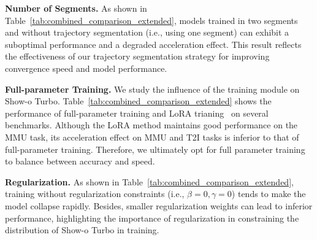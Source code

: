 \noindent \textbf{Number of Segments.}
As shown in Table~\ref{tab:combined_comparison_extended}, models trained in two segments and without trajectory segmentation (i.e., using one segment) can exhibit a suboptimal performance and a degraded acceleration effect. %
This result reflects the effectiveness of our trajectory segmentation strategy for improving convergence speed and model performance. 




\noindent \textbf{Full-parameter Training.} 
We study the influence of the training module on Show-o Turbo. 
Table~\ref{tab:combined_comparison_extended} shows the performance of full-parameter training and LoRA trianing~\cite{hu2021lora} on several benchmarks. 
Although the LoRA method maintains good performance on the MMU task, its acceleration effect on MMU and T2I tasks is inferior to that of full-parameter training. 
Therefore, we ultimately opt for full parameter training to balance between accuracy and speed. 

\noindent \textbf{Regularization.} 
As shown in Table~\ref{tab:combined_comparison_extended}, training without regularization constraints (i.e., $\beta=0, \gamma=0$) tends to make the model collapse rapidly. 
Besides, smaller regularization weights can lead to inferior performance, highlighting the importance of regularization in constraining the distribution of Show-o Turbo in training.

